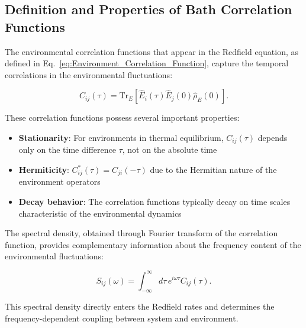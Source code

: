 \subsection{Definition and Properties of Bath Correlation Functions}

The environmental correlation functions that appear in the Redfield equation, as defined in Eq.~\eqref{eq:Environment_Correlation_Function}, capture the temporal correlations in the environmental fluctuations:

\begin{equation}
	C_{ij}(\tau) = \mathrm{Tr}_E[\hat{E}_i(\tau) \hat{E}_j(0) \hat{\rho}_E(0)].
	\label{eq:bath_correlator_detailed}
\end{equation}

These correlation functions possess several important properties:

\begin{itemize}
	\item \textbf{Stationarity}: For environments in thermal equilibrium, $C_{ij}(\tau)$ depends only on the time difference $\tau$, not on the absolute time
	\item \textbf{Hermiticity}: $C_{ij}^*(\tau) = C_{ji}(-\tau)$ due to the Hermitian nature of the environment operators
	\item \textbf{Decay behavior}: The correlation functions typically decay on time scales characteristic of the environmental dynamics
\end{itemize}

The spectral density, obtained through Fourier transform of the correlation function, provides complementary information about the frequency content of the environmental fluctuations:

\begin{equation}
	S_{ij}(\omega) = \int_{-\infty}^{\infty} d\tau \, e^{i\omega\tau} C_{ij}(\tau).
	\label{eq:spectral_density}
\end{equation}

This spectral density directly enters the Redfield rates and determines the frequency-dependent coupling between system and environment.
